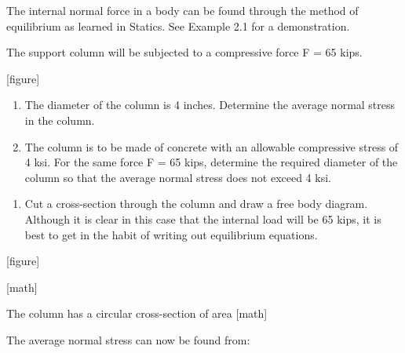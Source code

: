\documentclass[
  letterpaper,
  DIV=11,
  numbers=noendperiod]{scrreprt}
\providecommand{\tightlist}{%
  \setlength{\itemsep}{0pt}\setlength{\parskip}{0pt}}\usepackage{longtable,booktabs,array}
\begin{document}
The internal normal force in a body can be found through the method of
equilibrium as learned in Statics. See Example 2.1 for a demonstration.

\begin{tcolorbox}[enhanced jigsaw, colbacktitle=quarto-callout-note-color!10!white, title={Example 2.1: Simple normal stress}, coltitle=black, leftrule=.75mm, rightrule=.15mm, opacityback=0, breakable, colframe=quarto-callout-note-color-frame, left=2mm, arc=.35mm, colback=white, bottomrule=.15mm, bottomtitle=1mm, toptitle=1mm, titlerule=0mm, opacitybacktitle=0.6, toprule=.15mm]

The support column will be subjected to a compressive force F = 65 kips.

{[}figure{]}

\begin{enumerate}
\def\labelenumi{\arabic{enumi}.}
\item
  The diameter of the column is 4 inches. Determine the average normal
  stress in the column.
\item
  The column is to be made of concrete with an allowable compressive
  stress of 4 ksi. For the same force F = 65 kips, determine the
  required diameter of the column so that the average normal stress does
  not exceed 4 ksi.
\end{enumerate}

\begin{tcolorbox}[enhanced jigsaw, colbacktitle=quarto-callout-note-color!10!white, title={Solution}, coltitle=black, leftrule=.75mm, rightrule=.15mm, opacityback=0, breakable, colframe=quarto-callout-note-color-frame, left=2mm, arc=.35mm, colback=white, bottomrule=.15mm, bottomtitle=1mm, toptitle=1mm, titlerule=0mm, opacitybacktitle=0.6, toprule=.15mm]

\begin{enumerate}
\def\labelenumi{\arabic{enumi}.}
\tightlist
\item
  Cut a cross-section through the column and draw a free body diagram.
  Although it is clear in this case that the internal load will be 65
  kips, it is best to get in the habit of writing out equilibrium
  equations.
\end{enumerate}

{[}figure{]}

{[}math{]}

The column has a circular cross-section of area {[}math{]}

The average normal stress can now be found from:


\end{tcolorbox}
\end{tcolorbox}
\end{document}
